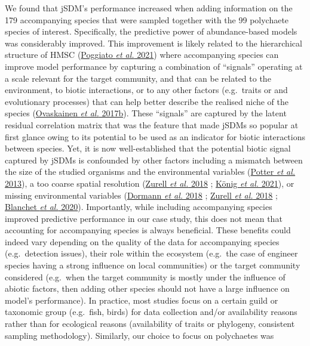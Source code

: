 \documentclass[9pt,biorxiv,doublespacing,lineno,endfloat]{lapreprint}
\begin{document}
We found that jSDM's performance increased when adding information on
the 179 accompanying species that were sampled together with the 99
polychaete species of interest. Specifically, the predictive power of
abundance-based models was considerably improved. This improvement is
likely related to the hierarchical structure of HMSC
(\protect\hyperlink{ref-Poggiato_2021}{Poggiato \emph{et al.} 2021})
where accompanying species can improve model performance by capturing a
combination of ``signals'' operating at a scale relevant for the target
community, and that can be related to the environment, to biotic
interactions, or to any other factors (e.g.~traits or and evolutionary
processes) that can help better describe the realised niche of the
species (\protect\hyperlink{ref-Ovaskainen_2017a}{Ovaskainen \emph{et
al.} 2017b}). These ``signals'' are captured by the latent residual
correlation matrix that was the feature that made jSDMs so popular at
first glance owing to its potential to be used as an indicator for
biotic interactions between species. Yet, it is now well-established
that the potential biotic signal captured by jSDMs is confounded by
other factors including a mismatch between the size of the studied
organisms and the environmental variables
(\protect\hyperlink{ref-Potter_2013}{Potter \emph{et al.} 2013}), a too
coarse spatial resolution (\protect\hyperlink{ref-Zurell_2018}{Zurell
\emph{et al.} 2018} ; \protect\hyperlink{ref-Konig_2021}{König \emph{et
al.} 2021}), or missing environmental variables
(\protect\hyperlink{ref-Dormann_2018}{Dormann \emph{et al.} 2018} ;
\protect\hyperlink{ref-Zurell_2018}{Zurell \emph{et al.} 2018} ;
\protect\hyperlink{ref-Blanchet_2020}{Blanchet \emph{et al.} 2020}).
Importantly, while including accompanying species improved predictive
performance in our case study, this does not mean that accounting for
accompanying species is always beneficial. These benefits could indeed
vary depending on the quality of the data for accompanying species
(e.g.~detection issues), their role within the ecosystem (e.g.~the case
of engineer species having a strong influence on local communities) or
the target community considered (e.g.~when the target community is
mostly under the influence of abiotic factors, then adding other species
should not have a large influence on model's performance). In practice,
most studies focus on a certain guild or taxonomic group (e.g.~fish,
birds) for data collection and/or availability reasons rather than for
ecological reasons (availability of traits or phylogeny, consistent
sampling methodology). Similarly, our choice to focus on polychaetes was
\end{document}
